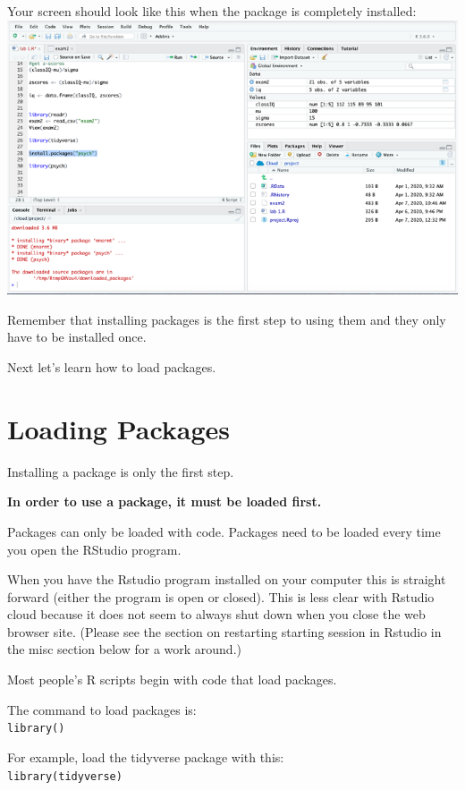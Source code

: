 \documentclass[
]{book}
\begin{document}
Your screen should look like this when the package is completely installed:\\
\includegraphics{img/instpsyc.png}

Remember that installing packages is the first step to using them and they only have to be installed once.

Next let's learn how to load packages.

\hypertarget{loading-packages}{%
\section{Loading Packages}\label{loading-packages}}

Installing a package is only the first step.

\textbf{In order to use a package, it must be loaded first.}

Packages can only be loaded with code. Packages need to be loaded every time you open the RStudio program.

When you have the Rstudio program installed on your computer this is straight forward (either the program is open or closed). This is less clear with Rstudio cloud because it does not seem to always shut down when you close the web browser site. (Please see the section on restarting starting session in Rstudio in the misc section below for a work around.)

Most people's R scripts begin with code that load packages.

The command to load packages is:\\
\texttt{library()}

For example, load the tidyverse package with this:\\
\texttt{library(tidyverse)}
\end{document}
